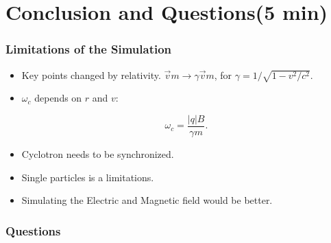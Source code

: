 \documentclass{beamer}
\begin{document}
\section{Conclusion and Questions(5 min)}
\begin{frame}
\frametitle{Limitations of the Simulation}
\begin{itemize}
\item<1-> Key points changed by relativity. $\vec{v} m\rightarrow \gamma \vec{v} m$, for $\gamma=1/\sqrt{1-v^2/c^2}.$

\item<2-> $\omega_c$ depends on $r$ and $v$:

\begin{equation}
\omega_c =\frac{|q|B}{\gamma m}.
\end{equation}

\item<3-> Cyclotron needs to be synchronized.


\item<4-> Single particles is a limitations.

\item<5-> Simulating the Electric and Magnetic field would be better.
\end{itemize}
\end{frame}


\begin{frame}
\frametitle{Questions}
\end{frame}


\end{document}
